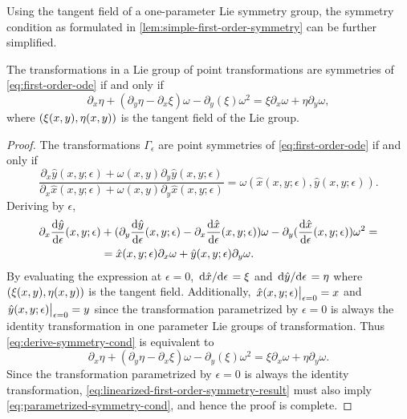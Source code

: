 Using the tangent field of a one-parameter Lie symmetry group, the symmetry condition as formulated in \cref{lem:simple-first-order-symmetry} can be further simplified.
\begin{lem} \label{lem:linearized-first-order-symmetry}
  The transformations in a Lie group of point transformations are symmetries of \cref{eq:first-order-ode} if and only if
  \begin{equation}
    \partial_x \eta + (\partial_y \eta - \partial_x \xi) \omega - \partial_y (\xi) \omega^2 =
    \xi \partial_x \omega + \eta \partial_y \omega,
  \end{equation}
  where \(\pqty{\xi(x,y), \eta(x,y)}\) is the tangent field of the Lie group.
\end{lem}
\begin{proof}
  The transformations \(\Gamma_\epsilon\) are point symmetries of \cref{eq:first-order-ode} if and only if
  \begin{equation} \label{eq:parametrized-symmetry-cond}
    \frac{\partial_x \hat{y}(x,y;\epsilon) + \omega(x,y) \partial_y \hat{y}(x,y;\epsilon)}{\partial_x \hat{x}(x,y;\epsilon) + \omega(x,y) \partial_y \hat{x}(x,y;\epsilon)} = \omega(\hat{x}(x,y;\epsilon),\hat{y}(x,y;\epsilon)).
  \end{equation}
  Deriving by \(\epsilon\),
  \begin{equation}
    \begin{split} \label{eq:derive-symmetry-cond}
      \partial_x \dv{\hat{y}}{\epsilon}{(x,y;\epsilon)} &+ (\partial_y \dv{\hat{y}}{\epsilon}{(x,y;\epsilon)} - \partial_x \dv{\hat{x}}{\epsilon}{(x,y;\epsilon)}) \omega - \partial_y (\dv{\hat{x}}{\epsilon}{(x,y;\epsilon)}) \omega^2 =\\
      &= \hat{x}(x,y;\epsilon) \partial_x \omega + \hat{y}(x,y;\epsilon) \partial_y \omega.
    \end{split}
  \end{equation}
  By evaluating the expression at \(\epsilon = 0\), \(\dv*{\hat{x}}{\epsilon} = \xi\) and \(\dv*{\hat{y}}{\epsilon} = \eta\) where \(\pqty{\xi(x,y), \eta(x,y)}\) is the tangent field.
  Additionally, \(\eval{\hat{x}(x,y;\epsilon)}_{\epsilon = 0} = x\) and \(\eval{\hat{y}(x,y;\epsilon)}_{\epsilon = 0} = y\) since the transformation parametrized by \(\epsilon = 0\) is always the identity transformation in one parameter Lie groups of transformation.
  Thus \cref{eq:derive-symmetry-cond} is equivalent to
  \begin{equation} \label{eq:linearized-first-order-symmetry-result}
    \partial_x \eta + (\partial_y \eta - \partial_x \xi) \omega - \partial_y (\xi) \omega^2 =
    \xi \partial_x \omega + \eta \partial_y \omega.
  \end{equation}
  Since the transformation parametrized by \(\epsilon = 0\) is always the identity transformation, \cref{eq:linearized-first-order-symmetry-result} must also imply \cref{eq:parametrized-symmetry-cond}, and hence the proof is complete.
\end{proof}

